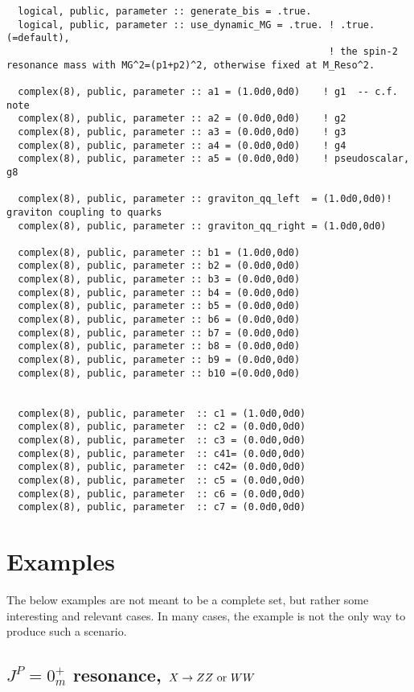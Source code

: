 \documentclass[aps,superscriptaddress,nofootinbib]{revtex4}
\begin{document}
\begin{verbatim}
  logical, public, parameter :: generate_bis = .true.
  logical, public, parameter :: use_dynamic_MG = .true. ! .true. (=default), 
													    ! the spin-2 resonance mass with MG^2=(p1+p2)^2, otherwise fixed at M_Reso^2. 

  complex(8), public, parameter :: a1 = (1.0d0,0d0)    ! g1  -- c.f. note
  complex(8), public, parameter :: a2 = (0.0d0,0d0)    ! g2
  complex(8), public, parameter :: a3 = (0.0d0,0d0)    ! g3
  complex(8), public, parameter :: a4 = (0.0d0,0d0)    ! g4
  complex(8), public, parameter :: a5 = (0.0d0,0d0)    ! pseudoscalar, g8

  complex(8), public, parameter :: graviton_qq_left  = (1.0d0,0d0)! graviton coupling to quarks
  complex(8), public, parameter :: graviton_qq_right = (1.0d0,0d0)

  complex(8), public, parameter :: b1 = (1.0d0,0d0)  
  complex(8), public, parameter :: b2 = (0.0d0,0d0)
  complex(8), public, parameter :: b3 = (0.0d0,0d0)
  complex(8), public, parameter :: b4 = (0.0d0,0d0)
  complex(8), public, parameter :: b5 = (0.0d0,0d0)
  complex(8), public, parameter :: b6 = (0.0d0,0d0)
  complex(8), public, parameter :: b7 = (0.0d0,0d0)
  complex(8), public, parameter :: b8 = (0.0d0,0d0)
  complex(8), public, parameter :: b9 = (0.0d0,0d0)  
  complex(8), public, parameter :: b10 =(0.0d0,0d0)  


  complex(8), public, parameter  :: c1 = (1.0d0,0d0)
  complex(8), public, parameter  :: c2 = (0.0d0,0d0)
  complex(8), public, parameter  :: c3 = (0.0d0,0d0)
  complex(8), public, parameter  :: c41= (0.0d0,0d0)
  complex(8), public, parameter  :: c42= (0.0d0,0d0)
  complex(8), public, parameter  :: c5 = (0.0d0,0d0)
  complex(8), public, parameter  :: c6 = (0.0d0,0d0) 
  complex(8), public, parameter  :: c7 = (0.0d0,0d0) 
\end{verbatim}

\section{ Examples }

\noindent
The below examples are not meant to be a complete set, but rather some interesting and relevant cases.  
In many cases, the example is not the only way to produce such a scenario.

\subsection{ $J^P = 0^+_m$ resonance, $X \to ZZ~{\rm or}~WW$}
\label{sec:exA}
\end{document}
